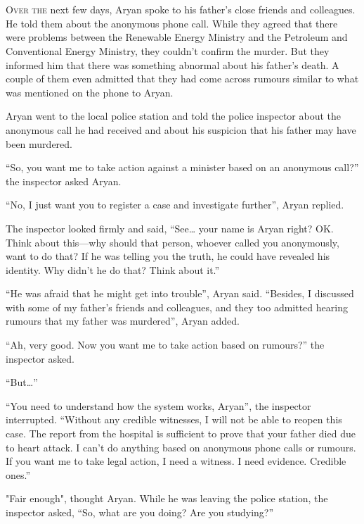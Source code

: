 \chapter{}

\lettrine{O}{ver the} next few days, Aryan spoke to his father's close friends and
colleagues. He told them about the anonymous phone call. While they agreed that
there were problems between the Renewable Energy Ministry and the
Petroleum and Conventional Energy Ministry, they couldn't confirm the murder. But
they informed him that there was something abnormal about his father's death. A
couple of them even admitted that they had come across rumours similar to what
was mentioned on the phone to Aryan.

Aryan went to the local police station and told the police inspector about the
anonymous call he had received and about his suspicion that his father may have been
murdered.

“So, you want me to take action against a minister based on an anonymous call?”
the inspector asked Aryan.

“No, I just want you to register a case and investigate further”, Aryan replied.

The inspector looked firmly and said, “See… your name is Aryan right? OK.
Think about this—why should that person, whoever called you anonymously, want
to do that? If he was telling you the truth, he could have revealed his
identity. Why didn't he do that? Think about it.”

“He was afraid that he might get into trouble”, Aryan said. “Besides, I
discussed with some of my father's friends and colleagues, and they too admitted
hearing rumours that my father was murdered”, Aryan added.

“Ah, very good. Now you want me to take action based on rumours?” the inspector
asked.

“But…”

“You need to understand how the system works, Aryan”, the inspector interrupted.
“Without any credible witnesses, I will not be able to reopen this case. The
report from the hospital is sufficient to prove that your father died due to
heart attack. I can't do anything based on anonymous phone calls or rumours. If
you want me to take legal action, I need a witness. I need evidence. Credible
ones.”

"Fair enough", thought Aryan. While he was leaving the police station, the
inspector asked, “So, what are you doing? Are you studying?”

